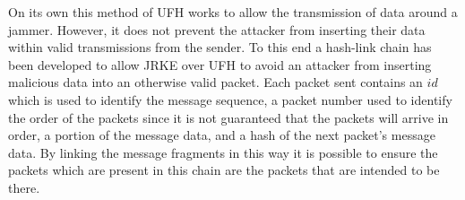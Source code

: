 \documentclass[sigconf, anonymous]{acmart}
\begin{document}
    
%    
%    
%    

On its own this method of UFH works to allow the transmission of data around a jammer. However, it does not prevent the attacker from inserting their data within valid transmissions from the sender. To this end a hash-link chain has been developed to allow JRKE over UFH to avoid an attacker from inserting malicious data into an otherwise valid packet. Each packet sent contains an $id$ which is used to identify the message sequence, a packet number used to identify the order of the packets since it is not guaranteed that the packets will arrive in order, a portion of the message data, and a hash of the next packet's message data. By linking the message fragments in this way it is possible to ensure the packets which are present in this chain are the packets that are intended to be there.


    
    
\end{document}
